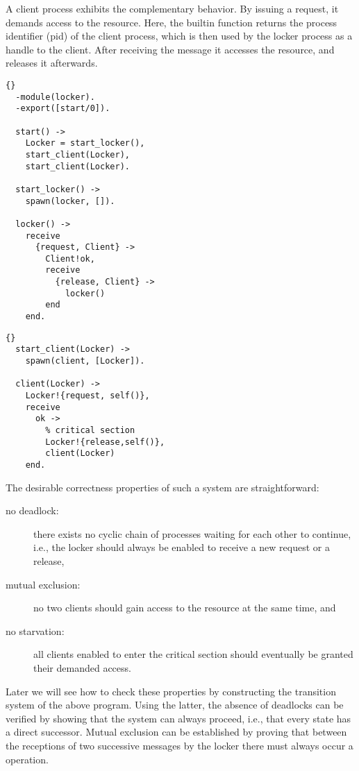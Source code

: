 \documentclass{entcs}
\begin{document}
A client process exhibits the complementary behavior. By issuing a request,
it demands access to the resource. Here, the \SELF builtin function returns
the process identifier (pid) of the client process, which is then used by the
locker process as a handle to the client. After receiving the 
message it accesses the resource, and releases it afterwards.

\begin{minipage}[t]{0.45\textwidth}
\begin{lstlisting}[gobble=2]{}
  -module(locker).
  -export([start/0]).

  start() ->
    Locker = start_locker(),
    start_client(Locker),
    start_client(Locker).

  start_locker() ->
    spawn(locker, []).

  locker() ->
    receive
      {request, Client} ->
        Client!ok,
        receive
          {release, Client} ->
            locker()
        end
    end.
\end{lstlisting}
\end{minipage}
\hfill
\begin{minipage}[t]{0.45\textwidth}
\begin{lstlisting}[gobble=2]{}
  start_client(Locker) ->
    spawn(client, [Locker]).

  client(Locker) ->
    Locker!{request, self()},
    receive
      ok ->
        % critical section
        Locker!{release,self()},
        client(Locker)
    end.
\end{lstlisting}
\end{minipage}

\medskip
The desirable correctness properties of such a system are straightforward:
\begin{description}
  \item[no deadlock:] there exists no cyclic chain of processes waiting for
    each other to continue, i.e., the locker should always be enabled to 
    receive a new request or a release, 
  \item[mutual exclusion:] no two clients should gain access to
    the resource at the same time, and 
  \item[no starvation:] all clients enabled to enter the critical section
    should eventually be granted their demanded access.
\end{description}

Later we will see how to check these properties by constructing the transition
system of the above program. Using the latter, the absence of deadlocks can be
verified by showing that the system can always proceed, i.e., that every state
has a direct successor. Mutual exclusion can be established by proving that
between the receptions of two successive  messages by the locker
there must always occur a  operation.
\end{document}
